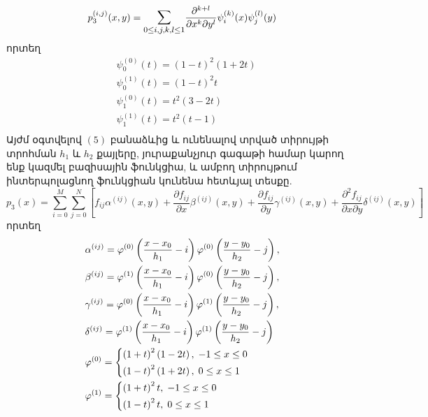 \documentclass[fleqn, bachelor,subf,12pt,notitlepage]{article}
\begin{document}
\begin{equation}
			p_{3}^{(i, j)}(x, y)= \mathlarger{\sum_{0 \leq i, j, k, l \leq 1}} \dfrac{\partial^{k+l}}{\partial x^{k} \partial y^{l}}  \psi_{i}^{(k)}(x)\psi_{j}^{(l)}(y)
\end{equation}
որտեղ
\begin{equation*}
\begin{aligned}
&\psi_{0}^{(0)}(t) = \left(1-t\right)^{2}\left(1+2t\right) \\
&\psi_{0}^{(1)}(t) = \left(1-t\right)^{2}t \\
&\psi_{1}^{(0)}(t) = t^{2}\left(3-2t\right) \\
&\psi_{1}^{(1)}(t) = t^{2}\left(t-1\right) \\
\end{aligned}
\end{equation*}
Այժմ օգտվելով $\left(5\right)$ բանաձևից և ունենալով տրված տիրույթի տրոհման $h_{1}$ և $h_{2}$ քայլերը, յուրաքանչյուր գագաթի համար կարող ենք կազմել բազիսային ֆունկցիա, և ամբող տիրույթում ինտերպոլացնող ֆունկցիան կունենա հետևյալ տեսքը.
\begin{equation}
p_{3}(x)=\sum_{i=0}^{M}\sum_{j=0}^{N}\left[f_{ij}\alpha^{(ij)}\left(x,y\right)+\dfrac{\partial f_{ij}}{\partial x}\beta^{(ij)}\left(x,y\right) +\dfrac{\partial f_{ij}}{\partial y}\gamma^{(ij)}\left(x,y\right) +\dfrac{\partial^{2} f_{ij}}{\partial x\partial y}\delta^{(ij)}\left(x,y\right)\right]
\end{equation}
որտեղ
\begin{equation}
\begin{aligned}
&\alpha^{(ij)} = \varphi^{(0)}\left(\dfrac{x-x_{0}}{h_{1}}-i\right) \varphi^{(0)}\left(\dfrac{y-y_{0}}{h_{2}}-j\right), \\
&\beta^{(ij)} = \varphi^{(1)}\left(\dfrac{x-x_{0}}{h_{1}}-i\right) \varphi^{(0)}\left(\dfrac{y-y_{0}}{h_{2}}-j\right), \\
&\gamma^{(ij)} = \varphi^{(0)}\left(\dfrac{x-x_{0}}{h_{1}}-i\right) \varphi^{(1)}\left(\dfrac{y-y_{0}}{h_{2}}-j\right), \\
&\delta^{(ij)} = \varphi^{(1)}\left(\dfrac{x-x_{0}}{h_{1}}-i\right) \varphi^{(1)}\left(\dfrac{y-y_{0}}{h_{2}}-j\right)\\
&\varphi^{(0)}=\begin{dcases}
\left(1+t\right)^{2}\left(1-2t\right), \; -1\leq x \leq 0 \\
\left(1-t\right)^{2}\left(1+2t\right), \; 0\leq  x \leq  1 \\
\end{dcases}
\\
&\varphi^{(1)}=\begin{dcases}
\left(1+t\right)^{2}t, \; -1\leq  x \leq 0 \\
\left(1-t\right)^{2}t, \; 0\leq  x \leq 1 \\
\end{dcases}
\end{aligned}
\end{equation}
\end{document}
